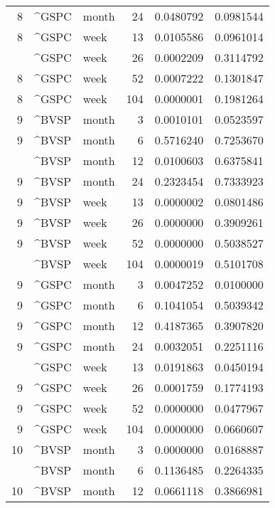 \begin{tabular}{rllrrr}
8 & \textasciicircum{}GSPC & month & 24 & 0.0480792 & 0.0981544\\
8 & \textasciicircum{}GSPC & week & 13 & 0.0105586 & 0.0961014\\
\addlinespace
8 & \textasciicircum{}GSPC & week & 26 & 0.0002209 & 0.3114792\\
8 & \textasciicircum{}GSPC & week & 52 & 0.0007222 & 0.1301847\\
8 & \textasciicircum{}GSPC & week & 104 & 0.0000001 & 0.1981264\\
9 & \textasciicircum{}BVSP & month & 3 & 0.0010101 & 0.0523597\\
9 & \textasciicircum{}BVSP & month & 6 & 0.5716240 & 0.7253670\\
\addlinespace
9 & \textasciicircum{}BVSP & month & 12 & 0.0100603 & 0.6375841\\
9 & \textasciicircum{}BVSP & month & 24 & 0.2323454 & 0.7333923\\
9 & \textasciicircum{}BVSP & week & 13 & 0.0000002 & 0.0801486\\
9 & \textasciicircum{}BVSP & week & 26 & 0.0000000 & 0.3909261\\
9 & \textasciicircum{}BVSP & week & 52 & 0.0000000 & 0.5038527\\
\addlinespace
9 & \textasciicircum{}BVSP & week & 104 & 0.0000019 & 0.5101708\\
9 & \textasciicircum{}GSPC & month & 3 & 0.0047252 & 0.0100000\\
9 & \textasciicircum{}GSPC & month & 6 & 0.1041054 & 0.5039342\\
9 & \textasciicircum{}GSPC & month & 12 & 0.4187365 & 0.3907820\\
9 & \textasciicircum{}GSPC & month & 24 & 0.0032051 & 0.2251116\\
\addlinespace
9 & \textasciicircum{}GSPC & week & 13 & 0.0191863 & 0.0450194\\
9 & \textasciicircum{}GSPC & week & 26 & 0.0001759 & 0.1774193\\
9 & \textasciicircum{}GSPC & week & 52 & 0.0000000 & 0.0477967\\
9 & \textasciicircum{}GSPC & week & 104 & 0.0000000 & 0.0660607\\
10 & \textasciicircum{}BVSP & month & 3 & 0.0000000 & 0.0168887\\
\addlinespace
10 & \textasciicircum{}BVSP & month & 6 & 0.1136485 & 0.2264335\\
10 & \textasciicircum{}BVSP & month & 12 & 0.0661118 & 0.3866981\\

\end{tabular}
